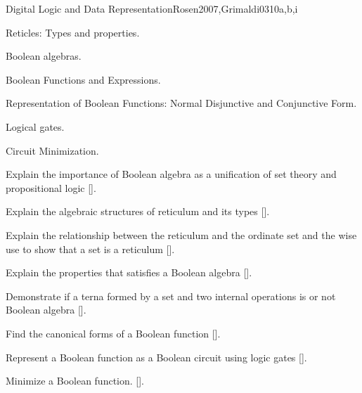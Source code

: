 \begin{syllabus}
\begin{unit}{Digital Logic and Data Representation}{}{Rosen2007,Grimaldi03}{10}{a,b,i}
    \begin{topics}
     \item Reticles: Types and properties.
     \item Boolean algebras.
     \item Boolean Functions and Expressions.
     \item Representation of Boolean Functions: Normal Disjunctive and Conjunctive Form.
     \item Logical gates.
     \item Circuit Minimization.
    \end{topics}
 
    \begin{learningoutcomes}
     \item Explain the importance of Boolean algebra as a unification of set theory and propositional logic [\Assessment].
     \item Explain the algebraic structures of reticulum and its types [\Assessment].
     \item Explain the relationship between the reticulum and the ordinate set and the wise use to show that a set is a reticulum [\Assessment].
     \item Explain the properties that satisfies a Boolean algebra [\Assessment].
     \item Demonstrate if a terna formed by a set and two internal operations is or not Boolean algebra [\Assessment].
     \item Find the canonical forms of a Boolean function  [\Assessment].
     \item Represent a Boolean function as a Boolean circuit using logic gates  [\Assessment].
     \item Minimize a Boolean function. [\Assessment].
     \end{learningoutcomes}
  \end{unit}


\end{syllabus}
